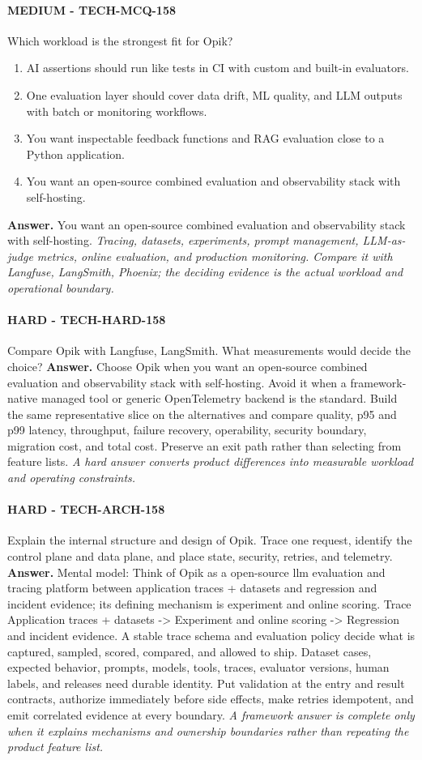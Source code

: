 \paragraph{MEDIUM - TECH-MCQ-158} Which workload is the strongest fit for Opik?
\begin{enumerate}[label=\Alph*.]
\item AI assertions should run like tests in CI with custom and built-in evaluators.
\item One evaluation layer should cover data drift, ML quality, and LLM outputs with batch or monitoring workflows.
\item You want inspectable feedback functions and RAG evaluation close to a Python application.
\item You want an open-source combined evaluation and observability stack with self-hosting.
\end{enumerate}
\textbf{Answer.} You want an open-source combined evaluation and observability stack with self-hosting.
\textit{Tracing, datasets, experiments, prompt management, LLM-as-judge metrics, online evaluation, and production monitoring. Compare it with Langfuse, LangSmith, Phoenix; the deciding evidence is the actual workload and operational boundary.}
\paragraph{HARD - TECH-HARD-158} Compare Opik with Langfuse, LangSmith. What measurements would decide the choice?
\textbf{Answer.} Choose Opik when you want an open-source combined evaluation and observability stack with self-hosting. Avoid it when a framework-native managed tool or generic OpenTelemetry backend is the standard. Build the same representative slice on the alternatives and compare quality, p95 and p99 latency, throughput, failure recovery, operability, security boundary, migration cost, and total cost. Preserve an exit path rather than selecting from feature lists.
\textit{A hard answer converts product differences into measurable workload and operating constraints.}
\paragraph{HARD - TECH-ARCH-158} Explain the internal structure and design of Opik. Trace one request, identify the control plane and data plane, and place state, security, retries, and telemetry.
\textbf{Answer.} Mental model: Think of Opik as a open-source llm evaluation and tracing platform between application traces + datasets and regression and incident evidence; its defining mechanism is experiment and online scoring. Trace Application traces + datasets -> Experiment and online scoring -> Regression and incident evidence. A stable trace schema and evaluation policy decide what is captured, sampled, scored, compared, and allowed to ship. Dataset cases, expected behavior, prompts, models, tools, traces, evaluator versions, human labels, and releases need durable identity. Put validation at the entry and result contracts, authorize immediately before side effects, make retries idempotent, and emit correlated evidence at every boundary.
\textit{A framework answer is complete only when it explains mechanisms and ownership boundaries rather than repeating the product feature list.}
